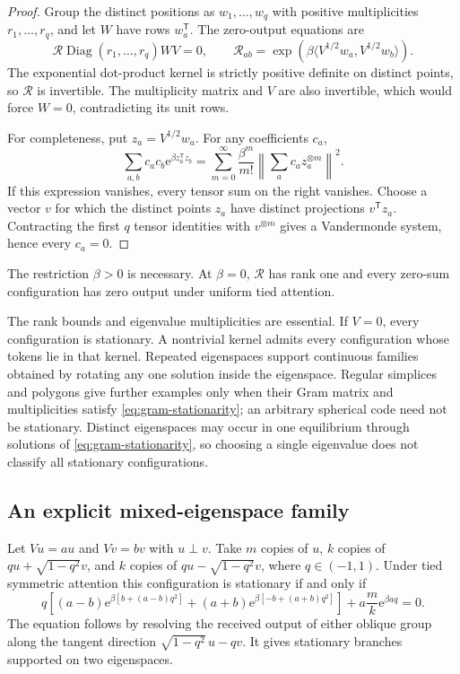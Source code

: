\documentclass[11pt,a4paper]{article}
\theoremstyle{definition}
\newcommand{\T}{\mathsf T}
\newcommand{\e}{\mathrm e}
\begin{document}
\begin{proof}
Group the distinct positions as $w_1,\ldots,w_q$ with positive multiplicities
$r_1,\ldots,r_q$, and let $W$ have rows $w_a^{\T}$.  The zero-output equations are
\[
 \mathcal R\operatorname{Diag}(r_1,\ldots,r_q)WV=0,\qquad
 \mathcal R_{ab}=\exp\!\left(
 \beta\langle V^{1/2}w_a,V^{1/2}w_b\rangle\right).
\]
The exponential dot-product kernel is strictly positive definite on distinct points,
so $\mathcal R$ is invertible.  The multiplicity matrix and $V$ are also invertible,
which would force $W=0$, contradicting its unit rows.

For completeness, put $z_a=V^{1/2}w_a$.  For any coefficients $c_a$,
\[
 \sum_{a,b}c_ac_b\e^{\beta z_a^{\T}z_b}
 =\sum_{m=0}^{\infty}\frac{\beta^m}{m!}
   \left\|\sum_a c_a z_a^{\otimes m}\right\|^2.
\]
If this expression vanishes, every tensor sum on the right vanishes.  Choose a vector
$v$ for which the distinct points $z_a$ have distinct projections $v^{\T}z_a$.
Contracting the first $q$ tensor identities with $v^{\otimes m}$ gives a Vandermonde
system, hence every $c_a=0$.
\end{proof}

The restriction $\beta>0$ is necessary.  At $\beta=0$, $\mathcal R$ has rank one and
every zero-sum configuration has zero output under uniform tied attention.

The rank bounds and eigenvalue multiplicities are essential.  If $V=0$, every
configuration is stationary.  A nontrivial kernel admits every configuration whose
tokens lie in that kernel.  Repeated eigenspaces support continuous families obtained
by rotating any one solution inside the eigenspace.  Regular simplices and polygons
give further examples only when their Gram matrix and multiplicities satisfy
\eqref{eq:gram-stationarity}; an arbitrary spherical code need not be stationary.
Distinct eigenspaces may occur in one equilibrium through solutions of
\eqref{eq:gram-stationarity}, so choosing a single eigenvalue does not classify all
stationary configurations.

\subsection{An explicit mixed-eigenspace family}

Let $Vu=au$ and $Vv=bv$ with $u\perp v$.  Take $m$ copies of $u$, $k$ copies of
$qu+\sqrt{1-q^2}v$, and $k$ copies of
$qu-\sqrt{1-q^2}v$, where $q\in(-1,1)$.  Under tied symmetric attention this
configuration is stationary if and only if
\begin{equation}
 q\left[
 (a-b)\e^{\beta[b+(a-b)q^2]}
 +(a+b)\e^{\beta[-b+(a+b)q^2]}
 \right]
 +a\frac{m}{k}\e^{\beta aq}=0.
 \label{eq:mixed-family}
\end{equation}
The equation follows by resolving the received output of either oblique group along
the tangent direction $\sqrt{1-q^2}\,u-qv$.  It gives stationary branches supported
on two eigenspaces.
\end{document}
